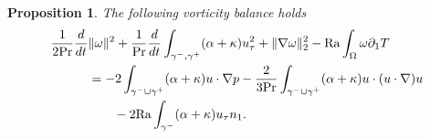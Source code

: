 \documentclass{article}
\newtheorem{proposition}[theorem]{Proposition}
\theoremstyle{definition}
\theoremstyle{definition}
\newcommand{\Pra}{\rm{Pr}}
\newcommand{\Ra}{{\rm{Ra}}}
\begin{document}
\begin{proposition}\label{vorticity-balance}
The following vorticity balance holds
\begin{align*}
    \frac{1}{2\Pra}\frac{d}{dt}&\|\omega\|^2 +\frac{1}{\Pra}\frac{d}{dt}\int_{\gamma^-,\gamma^+} (\alpha+\kappa)u_\tau^2 +\|\nabla \omega\|_2^2 - \Ra\int_{\Omega} \omega \partial_1 T 
    \\
    &=
    -2 \int_{\gamma^-\cup\gamma^+} (\alpha+\kappa) u \cdot \nabla p
    - \frac{2}{3\Pra}\int_{\gamma^-\cup\gamma^+} (\alpha+\kappa) u\cdot (u\cdot\nabla) u 
    \\
    &\qquad -2 \Ra \int_{\gamma^-} (\alpha+\kappa)u_\tau n_1.
\end{align*}
\end{proposition}
\end{document}
